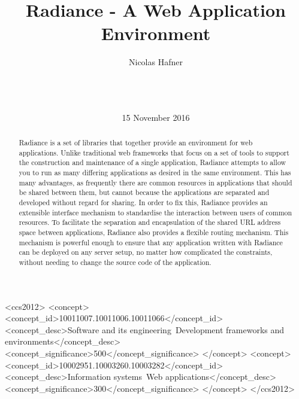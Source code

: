 \documentclass{sig-alternate}
\begin{document}
\doi{}
\isbn{}

\begin{CCSXML}
<ccs2012>
  <concept>
    <concept_id>10011007.10011006.10011066</concept_id>
    <concept_desc>Software and its engineering~Development frameworks and environments</concept_desc>
    <concept_significance>500</concept_significance>
  </concept>
  <concept>
    <concept_id>10002951.10003260.10003282</concept_id>
    <concept_desc>Information systems~Web applications</concept_desc>
    <concept_significance>300</concept_significance>
  </concept>
</ccs2012>
\end{CCSXML}


\title{Radiance - A Web Application Environment}

\author{
\alignauthor
Nicolas Hafner\\
       \\
       \\
       \\
}
\date{15 November 2016}

\maketitle

\begin{abstract}
  Radiance\cite{radiance} is a set of libraries that together provide an environment for web applications. Unlike traditional web frameworks that focus on a set of tools to support the construction and maintenance of a single application, Radiance attempts to allow you to run as many differing applications as desired in the same environment. This has many advantages, as frequently there are common resources in applications that should be shared between them, but cannot because the applications are separated and developed without regard for sharing. In order to fix this, Radiance provides an extensible interface mechanism to standardise the interaction between users of common resources. To facilitate the separation and encapsulation of the shared URL address space between applications, Radiance also provides a flexible routing mechanism. This mechanism is powerful enough to ensure that any application written with Radiance can be deployed on any server setup, no matter how complicated the constraints, without needing to change the source code of the application.
\end{abstract}
\end{document}
